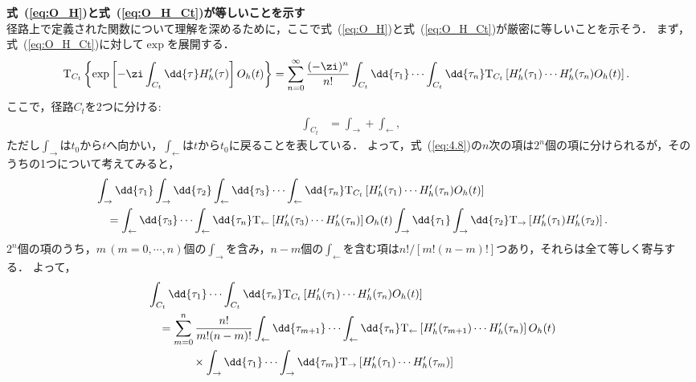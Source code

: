 \documentclass[a4paper,10pt]{jsarticle}
\begin{document}
\textbf{式~(\ref{eq:O_H})と式~(\ref{eq:O_H_Ct})が等しいことを示す}\\
径路上で定義された関数について理解を深めるために，ここで式~(\ref{eq:O_H})と式~(\ref{eq:O_H_Ct})が厳密に等しいことを示そう．
まず，式~(\ref{eq:O_H_Ct})に対して$\exp$を展開する．
\begin{align}
\mathrm{T}_{C_t} \left\{ \exp \left[ - \zi \int_{C_t} \dd{\tau} H'_h (\tau) \right] O_h (t) \right\}
	& = \sum_{n = 0}^{\infty} \frac{(-\zi)^n}{n!} \int_{C_t} \dd{\tau_1} \cdots \int_{C_t} \dd{\tau_n}
		\mathrm{T}_{C_t} \left[
			H'_h (\tau_1) \cdots H'_h (\tau_n) O_h (t)
		\right]
\label{eq:4.8}
.\end{align}
ここで，径路$C_t$を2つに分ける:
\begin{align}
\int_{C_t}
	& = \int_{\rightarrow} + \int_{\leftarrow}
,\end{align}
ただし$\int_{\rightarrow}$は$t_0$から$t$へ向かい，$\int_{\leftarrow}$は$t$から$t_0$に戻ることを表している．
よって，式~(\ref{eq:4.8})の$n$次の項は$2^n$個の項に分けられるが，そのうちの1つについて考えてみると，
\begin{align}
& \int_{\rightarrow} \dd{\tau_1} \int_{\rightarrow} \dd{\tau_2} \int_{\leftarrow} \dd{\tau_3} \cdots \int_{\leftarrow} \dd{\tau_n}
	\mathrm{T}_{C_t} \left[ H'_h (\tau_1) \cdots H'_h (\tau_n) O_h (t) \right]
\notag \\ & \hspace{1em}
	= \int_{\leftarrow} \dd{\tau_3} \cdots \int_{\leftarrow} \dd{\tau_n} \mathrm{T}_{\leftarrow} \left[ H'_h (\tau_3) \cdots H'_h (\tau_n) \right]
	O_h (t)
	\int_{\rightarrow} \dd{\tau_1} \int_{\rightarrow} \dd{\tau_2} \mathrm{T}_{\rightarrow} \left[ H'_h (\tau_1) H'_h (\tau_2) \right]
.\end{align}
$2^n$個の項のうち，$m \,(m = 0, \cdots, n)$個の$\int_{\rightarrow}$を含み，$n-m$個の$\int_{\leftarrow}$を含む項は$n! / [m! (n-m)!]$つあり，それらは全て等しく寄与する．
よって，
\begin{align}
& \int_{C_t} \dd{\tau_1} \cdots \int_{C_t} \dd{\tau_n} \mathrm{T}_{C_t} \left[ H'_h (\tau_1) \cdots H'_h (\tau_n) O_h (t) \right]
\notag \\ & \hspace{1em}
	= \sum_{m = 0}^{n} \frac{n!}{m! (n-m)!}
	\int_{\leftarrow} \dd{\tau_{m+1}} \cdots \int_{\leftarrow} \dd{\tau_n} \mathrm{T}_{\leftarrow} \left[ H'_h (\tau_{m+1}) \cdots H'_h (\tau_n) \right]
	O_h (t)
\notag \\ & \hspace{4em} \times
	\int_{\rightarrow} \dd{\tau_1} \cdots \int_{\rightarrow} \dd{\tau_m} \mathrm{T}_{\rightarrow} \left[ H'_h (\tau_1) \cdots H'_h (\tau_m) \right]	
\label{eq:4.11}
\end{align}
\end{document}
